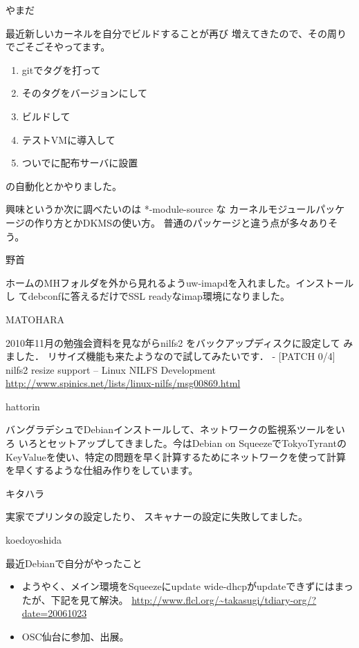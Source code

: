 
\begin{prework}{ やまだ }

最近新しいカーネルを自分でビルドすることが再び
増えてきたので、その周りでごそごそやってます。
\begin{enumerate}
\item gitでタグを打って
\item そのタグをバージョンにして
\item ビルドして
\item テストVMに導入して
\item ついでに配布サーバに設置
\end{enumerate}

の自動化とかやりました。

興味というか次に調べたいのは *-module-source な
カーネルモジュールパッケージの作り方とかDKMSの使い方。
普通のパッケージと違う点が多々ありそう。
\end{prework}

\begin{prework}{ 野首 }

ホームのMHフォルダを外から見れるようuw-imapdを入れました。インストールし
 てdebconfに答えるだけでSSL readyなimap環境になりました。
\end{prework}

\begin{prework}{ MATOHARA }

2010年11月の勉強会資料を見ながらnilfs2 をバックアップディスクに設定して
 みました．
リサイズ機能も来たようなので試してみたいです．
- [PATCH 0/4] nilfs2 resize support -- Linux NILFS Development
\url{http://www.spinics.net/lists/linux-nilfs/msg00869.html}
\end{prework}

\begin{prework}{ hattorin }

バングラデシュでDebianインストールして、ネットワークの監視系ツールをいろ
 いろとセットアップしてきました。今はDebian on SqueezeでTokyoTyrantの
 KeyValueを使い、特定の問題を早く計算するためにネットワークを使って計算
 を早くするような仕組み作りをしています。
\end{prework}

\begin{prework}{ キタハラ }

実家でプリンタの設定したり、
スキャナーの設定に失敗してました。

\end{prework}

\begin{prework}{ koedoyoshida }

最近Debianで自分がやったこと
\begin{itemize}
\item ようやく、メイン環境をSqueezeにupdate
wide-dhcpがupdateできずにはまったが、下記を見て解決。
\url{http://www.flcl.org/~takasugi/tdiary-org/?date=20061023}
\item OSC仙台に参加、出展。
\end{itemize}


\end{prework}

